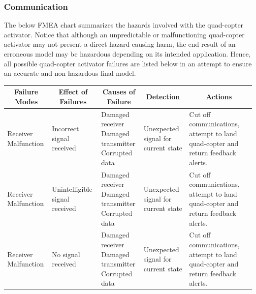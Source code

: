 \documentclass[10pt,letterpaper]{article}
\newcommand{\fmeaheader}{\multicolumn{1}{c}{\textbf{Failure Modes}} & \multicolumn{1}{c}{\textbf{Effect of Failures}} & \multicolumn{1}{c}{\textbf{Causes of Failure}} & \multicolumn{1}{c}{\textbf{Detection}} & \multicolumn{1}{c}{\textbf{Actions}}}
\begin{document}
\newpage 

\subsubsection{Communication}
The below FMEA chart summarizes the hazards involved with the quad-copter activator. Notice that although an unpredictable or malfunctioning quad-copter activator may not present a direct hazard causing harm, the end result of an erroneous model may be hazardous depending on its intended application. Hence, all possible quad-copter activator failures are listed below in an attempt to ensure an accurate and non-hazardous final model. 
\begin{table}[H]
\footnotesize  
	\begin{adjustwidth}{-1.8in}{-1.8in}  
      \begin{center}
          \begin{tabular}{|p{3cm}p{3cm}p{3cm}p{3cm}p{3cm}|}
             \fmeaheader \\ \hline
              
              Receiver Malfunction & 
              Incorrect signal received & 
              \parbox[t]{3cm}{Damaged receiver \\ Damaged transmitter \\ Corrupted data} &  
              Unexpected signal for current state & 
              Cut off communications, attempt to land quad-copter and return feedback alerts. \\ \hline  
              
              Receiver Malfunction & 
              Unintelligible signal received & 
              \parbox[t]{3cm}{Damaged receiver \\ Damaged transmitter \\ Corrupted data} &  
              Unexpected signal for current state & 
              Cut off communications, attempt to land quad-copter and return feedback alerts. \\ \hline  
              
              Receiver Malfunction & 
              No signal received & 
              \parbox[t]{3cm}{Damaged receiver \\ Damaged transmitter \\ Corrupted data} &  
              Unexpected signal for current state & 
              Cut off communications, attempt to land quad-copter and return feedback alerts. \\ \hline  
              

\end{tabular}
\end{center}
\end{adjustwidth}
\end{table}
\end{document}
